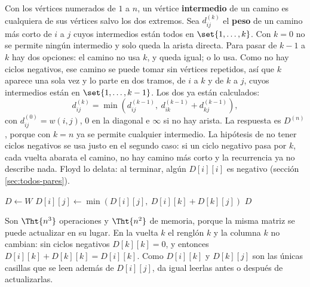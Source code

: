 \documentclass[11pt,letterpaper]{article}
\begin{document}
Con los vértices numerados de $1$ a $n$, un vértice
\textbf{intermedio} de un camino es cualquiera de sus vértices salvo
los dos extremos. Sea $d^{(k)}_{ij}$ el \textbf{peso} de un camino más
corto de $i$ a $j$ cuyos intermedios están todos en
$\set{1, \dots, k}$. Con $k = 0$ no se permite ningún intermedio y
solo queda la arista directa. Para pasar de $k - 1$ a $k$ hay dos
opciones: el camino no usa $k$, y queda igual; o lo usa. Como no hay
ciclos negativos, ese camino se puede tomar sin vértices repetidos,
así que $k$ aparece una sola vez y lo parte en dos tramos, de $i$ a
$k$ y de $k$ a $j$, cuyos intermedios están en
$\set{1, \dots, k - 1}$. Los dos ya están calculados:
\[
  d^{(k)}_{ij} = \min\left( d^{(k-1)}_{ij},\
                 d^{(k-1)}_{ik} + d^{(k-1)}_{kj} \right) ,
\]
con $d^{(0)}_{ij} = w(i, j)$, $0$ en la diagonal e $\infty$ si no hay
arista. La respuesta es $D^{(n)}$, porque con $k = n$ ya se permite
cualquier intermedio. La hipótesis de no tener ciclos negativos se usa
justo en el segundo caso: si un ciclo negativo pasa por $k$, cada
vuelta abarata el camino, no hay camino más corto y la recurrencia ya
no describe nada. Floyd lo delata: al terminar, algún $D[i][i]$ es
negativo (sección \ref{sec:todos-pares}).

\begin{algorithm}[H]
\caption{\textsc{Floyd}$(W, n)$}
\begin{algorithmic}[1]
\State $D \gets W$
      \State $D[i][j] \gets \min(D[i][j],\ D[i][k] + D[k][j])$
    \EndFor
  \EndFor
\EndFor
\State \Return $D$
\end{algorithmic}
\end{algorithm}

Son $\Tht{n^3}$ operaciones y $\Tht{n^2}$ de memoria, porque la misma
matriz se puede actualizar en su lugar. En la vuelta $k$ el renglón
$k$ y la columna $k$ no cambian: sin ciclos negativos $D[k][k] = 0$,
y entonces $D[i][k] + D[k][k] = D[i][k]$. Como $D[i][k]$ y $D[k][j]$
son las únicas casillas que se leen además de $D[i][j]$, da igual
leerlas antes o después de actualizarlas.
\end{document}
